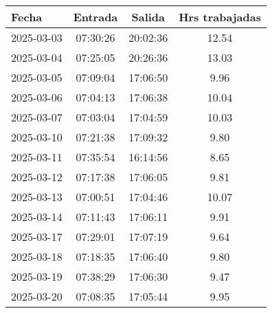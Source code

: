 \documentclass[11pt,a4paper]{article}
\newcommand{\mejoradatabla}[1]{
  \renewcommand{\arraystretch}{1.3}
  \setlength{\tabcolsep}{10pt}
  #1
  \renewcommand{\arraystretch}{1}
  \setlength{\tabcolsep}{6pt}
}
\begin{document}
\begin{minipage}[t]{0.62\textwidth}
\mejoradatabla{
\begin{tabular}{lccc}
\toprule
\rowcolor{grisclaro} \textbf{Fecha} & \textbf{Entrada} & \textbf{Salida} & \textbf{Hrs trabajadas}\\
\midrule

2025-03-03 & 07:30:26 & 20:02:36 & 12.54\\

2025-03-04 & 07:25:05 & 20:26:36 & 13.03\\

2025-03-05 & 07:09:04 & 17:06:50 & 9.96\\

2025-03-06 & 07:04:13 & 17:06:38 & 10.04\\

2025-03-07 & 07:03:04 & 17:04:59 & 10.03\\

2025-03-10 & 07:21:38 & 17:09:32 & 9.80\\

2025-03-11 & 07:35:54 & 16:14:56 & 8.65\\

2025-03-12 & 07:17:38 & 17:06:05 & 9.81\\

2025-03-13 & 07:00:51 & 17:04:46 & 10.07\\

2025-03-14 & 07:11:43 & 17:06:11 & 9.91\\

2025-03-17 & 07:29:01 & 17:07:19 & 9.64\\

2025-03-18 & 07:18:35 & 17:06:40 & 9.80\\

2025-03-19 & 07:38:29 & 17:06:30 & 9.47\\

2025-03-20 & 07:08:35 & 17:05:44 & 9.95\\

\bottomrule
\end{tabular}
}
\end{minipage}
\hfill
\end{document}

